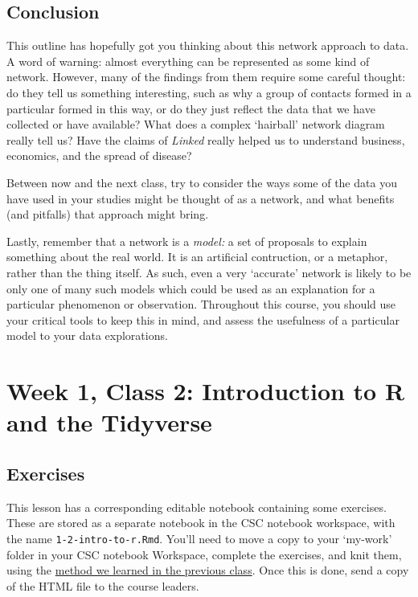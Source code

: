 \documentclass[
]{book}
\begin{document}
\hypertarget{conclusion}{%
\section{Conclusion}\label{conclusion}}

This outline has hopefully got you thinking about this network approach to data. A word of warning: almost everything can be represented as some kind of network. However, many of the findings from them require some careful thought: do they tell us something interesting, such as why a group of contacts formed in a particular formed in this way, or do they just reflect the data that we have collected or have available? What does a complex `hairball' network diagram really tell us? Have the claims of \emph{Linked} really helped us to understand business, economics, and the spread of disease?

Between now and the next class, try to consider the ways some of the data you have used in your studies might be thought of as a network, and what benefits (and pitfalls) that approach might bring.

Lastly, remember that a network is a \emph{model:} a set of proposals to explain something about the real world. It is an artificial contruction, or a metaphor, rather than the thing itself. As such, even a very `accurate' network is likely to be only one of many such models which could be used as an explanation for a particular phenomenon or observation. Throughout this course, you should use your critical tools to keep this in mind, and assess the usefulness of a particular model to your data explorations.

\hypertarget{week-1-class-2-introduction-to-r-and-the-tidyverse}{%
\chapter{Week 1, Class 2: Introduction to R and the Tidyverse}\label{week-1-class-2-introduction-to-r-and-the-tidyverse}}

\hypertarget{exercises}{%
\section{Exercises}\label{exercises}}

This lesson has a corresponding editable notebook containing some exercises. These are stored as a separate notebook in the CSC notebook workspace, with the name \texttt{1-2-intro-to-r.Rmd}. You'll need to move a copy to your `my-work' folder in your CSC notebook Workspace, complete the exercises, and knit them, using the \href{https://comhis.github.io/applying-network-analysis-to-humanities/notebooks/1-1-introduction_nb.html}{method we learned in the previous class}. Once this is done, send a copy of the HTML file to the course leaders.
\end{document}
